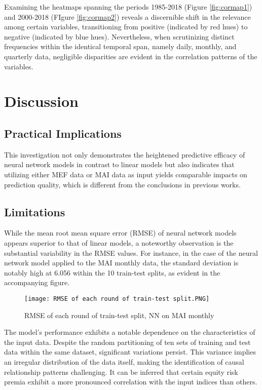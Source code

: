 \documentclass{article}
\begin{document}
\noindent Examining the heatmaps spanning the periods 1985-2018 (Figure \ref{fig:cormap1}) and 2000-2018 (FIgure \ref{fig:cormap2}) reveals a discernible shift in the relevance among certain variables, transitioning from positive (indicated by red hues) to negative (indicated by blue hues). Nevertheless, when scrutinizing distinct frequencies within the identical temporal span, namely daily, monthly, and quarterly data, negligible disparities are evident in the correlation patterns of the variables.

\newpage

\section{Discussion}

\subsection{Practical Implications}

This investigation not only demonstrates the heightened predictive efficacy of neural network models in contrast to linear models but also indicates that utilizing either MEF data or MAI data as input yields comparable impacts on prediction quality, which is different from the conclusions in previous works.

\subsection{Limitations}

While the mean root mean square error (RMSE) of neural network models appears superior to that of linear models, a noteworthy observation is the substantial variability in the RMSE values. For instance, in the case of the neural network model applied to the MAI monthly data, the standard deviation is notably high at 6.056 within the 10 train-test splits, as evident in the accompanying figure.
\begin{figure}[H]
    \centering \texttt{[image: RMSE of each round of train-test split.PNG]}
    \caption{RMSE of each round of train-test split, NN on MAI monthly}
\end{figure}
\noindent The model's performance exhibits a notable dependence on the characteristics of the input data. Despite the random partitioning of ten sets of training and test data within the same dataset, significant variations persist. This variance implies an irregular distribution of the data itself, making the identification of causal relationship patterns challenging. It can be inferred that certain equity risk premia exhibit a more pronounced correlation with the input indices than others.
\end{document}
